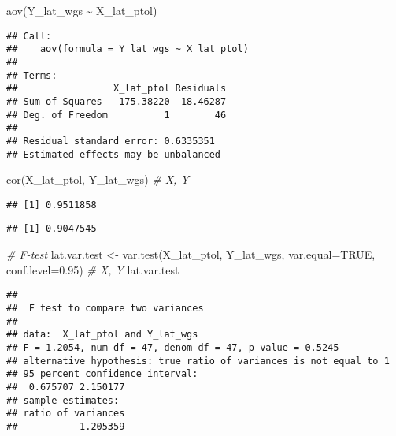 \documentclass[
]{article}
\newenvironment{Shaded}{\begin{snugshade}}{\end{snugshade}}
\newcommand{\AttributeTok}[1]{\textcolor[rgb]{0.77,0.63,0.00}{#1}}
\newcommand{\CommentTok}[1]{\textcolor[rgb]{0.56,0.35,0.01}{\textit{#1}}}
\newcommand{\ConstantTok}[1]{\textcolor[rgb]{0.00,0.00,0.00}{#1}}
\newcommand{\FloatTok}[1]{\textcolor[rgb]{0.00,0.00,0.81}{#1}}
\newcommand{\FunctionTok}[1]{\textcolor[rgb]{0.00,0.00,0.00}{#1}}
\newcommand{\NormalTok}[1]{#1}
\newcommand{\OtherTok}[1]{\textcolor[rgb]{0.56,0.35,0.01}{#1}}
\newcommand{\SpecialCharTok}[1]{\textcolor[rgb]{0.00,0.00,0.00}{#1}}
\begin{document}
\begin{Shaded}
\begin{Highlighting}[]
\FunctionTok{aov}\NormalTok{(Y\_lat\_wgs }\SpecialCharTok{\textasciitilde{}}\NormalTok{ X\_lat\_ptol)}
\end{Highlighting}
\end{Shaded}

\begin{verbatim}
## Call:
##    aov(formula = Y_lat_wgs ~ X_lat_ptol)
## 
## Terms:
##                 X_lat_ptol Residuals
## Sum of Squares   175.38220  18.46287
## Deg. of Freedom          1        46
## 
## Residual standard error: 0.6335351
## Estimated effects may be unbalanced
\end{verbatim}

\begin{Shaded}
\begin{Highlighting}[]
\FunctionTok{cor}\NormalTok{(X\_lat\_ptol, Y\_lat\_wgs) }\CommentTok{\# X, Y}
\end{Highlighting}
\end{Shaded}

\begin{verbatim}
## [1] 0.9511858
\end{verbatim}

\begin{Shaded}
\end{Shaded}

\begin{verbatim}
## [1] 0.9047545
\end{verbatim}

\begin{Shaded}
\begin{Highlighting}[]
\CommentTok{\# F{-}test}
\NormalTok{lat.var.test }\OtherTok{\textless{}{-}} \FunctionTok{var.test}\NormalTok{(X\_lat\_ptol, Y\_lat\_wgs, }\AttributeTok{var.equal=}\ConstantTok{TRUE}\NormalTok{, }\AttributeTok{conf.level=}\FloatTok{0.95}\NormalTok{) }\CommentTok{\# X, Y}
\NormalTok{lat.var.test}
\end{Highlighting}
\end{Shaded}

\begin{verbatim}
## 
##  F test to compare two variances
## 
## data:  X_lat_ptol and Y_lat_wgs
## F = 1.2054, num df = 47, denom df = 47, p-value = 0.5245
## alternative hypothesis: true ratio of variances is not equal to 1
## 95 percent confidence interval:
##  0.675707 2.150177
## sample estimates:
## ratio of variances 
##           1.205359
\end{verbatim}
\end{document}
